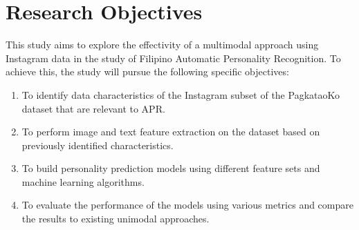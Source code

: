 




\section{Research Objectives}
\label{sec: objectives}
This study aims to explore the effectivity of a multimodal approach using Instagram data in the study of Filipino Automatic Personality Recognition. To achieve this, the study will pursue the following specific objectives:

\begin{enumerate}
	\item To identify data characteristics of the Instagram subset of the PagkataoKo dataset that are relevant to APR.

	\item To perform image and text feature extraction on the dataset based on previously identified characteristics.

	\item To build personality prediction models using different feature sets and machine learning algorithms.

	\item To evaluate the performance of the models using various metrics and compare the results to existing unimodal approaches.
\end{enumerate}



